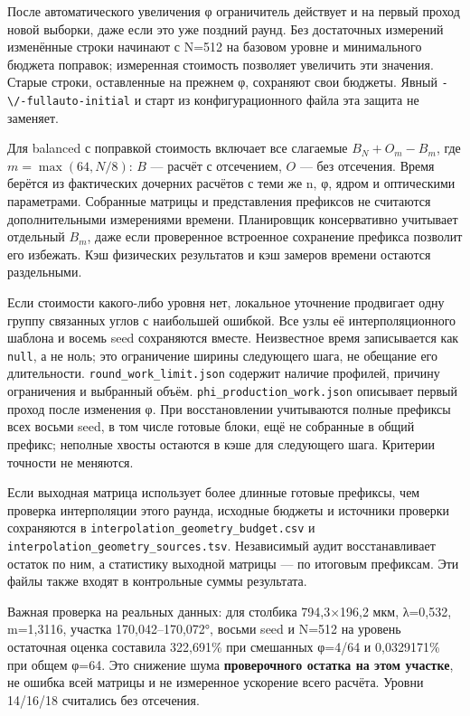 После автоматического увеличения φ ограничитель действует и на первый
проход новой выборки, даже если это уже поздний раунд. Без достаточных
измерений изменённые строки начинают с N=512 на базовом уровне и
минимального бюджета поправок; измеренная стоимость позволяет увеличить
эти значения. Старые строки, оставленные на прежнем φ, сохраняют свои
бюджеты. Явный \nolinkurl{-\/-fullauto-initial} и старт из
конфигурационного файла эта защита не заменяет.

Для balanced с поправкой стоимость включает все слагаемые
\(B_N+O_m-B_m\), где \(m=\max(64,N/8)\): \(B\) --- расчёт с отсечением,
\(O\) --- без отсечения. Время берётся из фактических дочерних расчётов
с теми же n, φ, ядром и оптическими параметрами. Собранные матрицы и
представления префиксов не считаются дополнительными измерениями
времени. Планировщик консервативно учитывает отдельный \(B_m\), даже
если проверенное встроенное сохранение префикса позволит его избежать.
Кэш физических результатов и кэш замеров времени остаются раздельными.

Если стоимости какого-либо уровня нет, локальное уточнение продвигает
одну группу связанных углов с наибольшей ошибкой. Все узлы её
интерполяционного шаблона и восемь seed сохраняются вместе. Неизвестное
время записывается как \texttt{null}, а не ноль; это ограничение ширины
следующего шага, не обещание его длительности.
\nolinkurl{round_work_limit.json} содержит наличие профилей, причину
ограничения и выбранный объём. \nolinkurl{phi_production_work.json}
описывает первый проход после изменения φ. При восстановлении
учитываются полные префиксы всех восьми seed, в том числе готовые блоки,
ещё не собранные в общий префикс; неполные хвосты остаются в кэше для
следующего шага. Критерии точности не меняются.

Если выходная матрица использует более длинные готовые префиксы, чем
проверка интерполяции этого раунда, исходные бюджеты и источники
проверки сохраняются в \nolinkurl{interpolation_geometry_budget.csv} и
\nolinkurl{interpolation_geometry_sources.tsv}. Независимый аудит
восстанавливает остаток по ним, а статистику выходной матрицы --- по
итоговым префиксам. Эти файлы также входят в контрольные суммы
результата.

Важная проверка на реальных данных: для столбика 794,3×196,2 мкм,
λ=0,532, m=1,3116, участка 170,042--170,072°, восьми seed и N=512 на
уровень остаточная оценка составила 322,691\% при смешанных φ=4/64 и
0,0329171\% при общем φ=64. Это снижение шума \textbf{проверочного
остатка на этом участке}, не ошибка всей матрицы и не измеренное
ускорение всего расчёта. Уровни 14/16/18 считались без отсечения.

